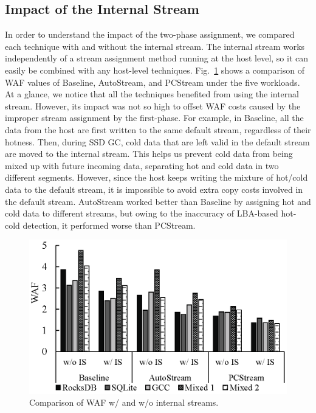 \subsection{Impact of the Internal Stream}

In order to understand the impact of the two-phase assignment, we compared each
technique with and without the internal stream.  The internal stream works
independently of a stream assignment method running at the host level, so it
can easily be combined with any host-level techniques.  Fig.~\ref{fig:internal}
shows a comparison of WAF values of Baseline, AutoStream, and PCStream under
the five workloads.  At a glance, we notice that all the techniques benefited
from using the internal stream.  However, its impact was not so high to offset
WAF costs caused by the improper stream assignment by the first-phase.  For
example, in Baseline, all the data from the host are first written to the same
default stream, regardless of their hotness.  Then, during SSD GC, cold data
that are left valid in the default stream are moved to the internal stream.
This helps us prevent cold data from being mixed up with future incoming data,
separating hot and cold data in two different segments. However, since the host
keeps writing the mixture of hot/cold data to the default stream, it is
impossible to avoid extra copy costs involved in the default stream.
AutoStream worked better than Baseline by assigning hot and cold data to
different streams, but owing to the inaccuracy of LBA-based hot-cold detection,
it performed worse than PCStream.

\begin{figure}[t]
	\centering
	\includegraphics[width=0.9\linewidth]{figure/internal}
	\caption{Comparison of WAF w/ and w/o internal streams.}
	\label{fig:internal}
\end{figure}


